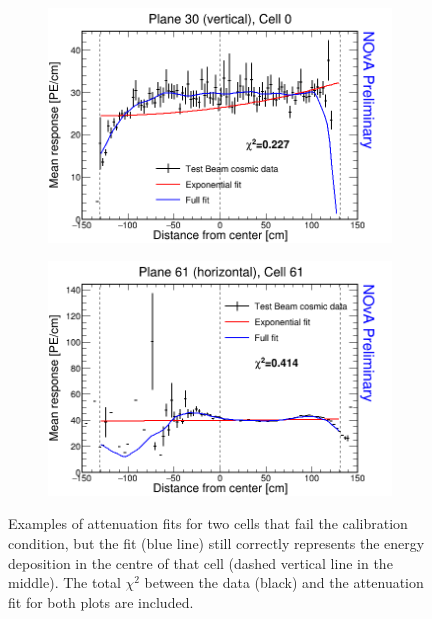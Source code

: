 
\begin{figure}[h]
\centering
\begin{subfigure}[b]{0.495\textwidth}
\centering
\includegraphics[width=\textwidth]{Plots/TBCalibration/ExampleForBrightFile_fb0_030_000.png}
\end{subfigure}
\begin{subfigure}[b]{0.495\textwidth}
\centering
\includegraphics[width=\textwidth]{Plots/TBCalibration/ExampleForBrightFile_fb5_061_061.png}
\end{subfigure}
\caption[Example of failed attenuation fits used for the Test Beam fibre brightness file]{Examples of attenuation fits for two cells that fail the calibration condition, but the fit (blue line) still correctly represents the energy deposition in the centre of that cell (dashed vertical line in the middle). The total $\chi^2$ between the data (black) and the attenuation fit for both plots are included.}
\label{fig:FiberBrightnessExamples}
\end{figure}

